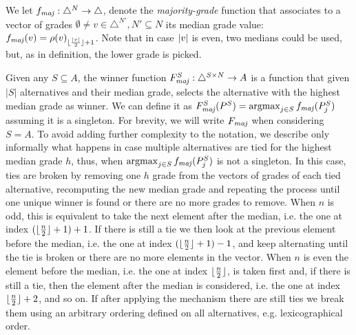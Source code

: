 We let $\fmaj:\triangle^{N} \rightarrow \triangle$, denote the \emph{majority-grade} function that associates to a vector of grades $\emptyset \neq v \in \triangle^{N'}, N' \subseteq N$ its median grade value: $\fmaj(v) = \rho(v)_{\floor{\frac{\card{v}}{2}} + 1}$. Note that in case $\lvert v\rvert$ is even, two medians could be used, but, as in \citet{Balinski2011} definition, the lower grade is picked. 


Given any $S\subseteq A$, the winner function $\Fmaj[S]:\triangle^{S \times N} \rightarrow A$ %
is a function that given $|S|$ alternatives and their median grade, selects the alternative with the highest median grade as winner. We can define it as  $\Fmaj[S](P^S) = \argmax_{j\in S}\fmaj(P^S_j)$ assuming it is a singleton. 
For brevity, we will write $\Fmaj$ when considering $S=A$.
To avoid adding further complexity to the notation, we describe only informally what happens in case multiple alternatives are tied for the highest median grade $h$, thus, when $\argmax_{j\in S}\fmaj(P^S_j)$ is not a singleton.
In this case, ties are broken by removing one $h$ grade from the vectors of grades of each tied alternative, recomputing the new median grade and repeating the process until one unique winner is found or there are no more grades to remove. When $n$ is odd, this is equivalent to take the next element after the median, i.e. the one at index $(\lfloor\frac{n}{2}\rfloor + 1) +1$. If there is still a tie we then look at the previous element before the median, i.e. the one at index $(\lfloor\frac{n}{2}\rfloor + 1) -1$, and keep alternating until the tie is broken or there are no more elements in the vector. When $n$ is even the element before the median, i.e. the one at index $\lfloor\frac{n}{2}\rfloor$, is taken first and, if there is still a tie, then the element after the median is considered, i.e. the one at index $\lfloor\frac{n}{2}\rfloor + 2$, and so on. If after applying the mechanism there are still ties we break them using an arbitrary ordering defined on all alternatives, e.g. lexicographical order.

